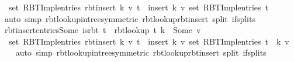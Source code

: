 \begin{isabellebody}
\ \ set\ {\isacharparenleft}{\kern0pt}RBT{\isacharunderscore}{\kern0pt}Impl{\isachardot}{\kern0pt}entries\ {\isacharparenleft}{\kern0pt}rbt{\isacharunderscore}{\kern0pt}insert\ k\ v\ t{\isacharparenright}{\kern0pt}{\isacharparenright}{\kern0pt}\ {\isacharequal}{\kern0pt}\ insert\ {\isacharparenleft}{\kern0pt}k{\isacharcomma}{\kern0pt}\ v{\isacharparenright}{\kern0pt}\ {\isacharparenleft}{\kern0pt}set\ {\isacharparenleft}{\kern0pt}RBT{\isacharunderscore}{\kern0pt}Impl{\isachardot}{\kern0pt}entries\ t{\isacharparenright}{\kern0pt}{\isacharparenright}{\kern0pt}{\isachardoublequoteclose}\isanewline
%
\isadelimproof
\ \ %
\endisadelimproof
%
\isatagproof
{}\isamarkupfalse%
\ {\isacharparenleft}{\kern0pt}auto\ simp{\isacharcolon}{\kern0pt}\ rbt{\isacharunderscore}{\kern0pt}lookup{\isacharunderscore}{\kern0pt}in{\isacharunderscore}{\kern0pt}tree{\isacharbrackleft}{\kern0pt}symmetric{\isacharbrackright}{\kern0pt}\ rbt{\isacharunderscore}{\kern0pt}lookup{\isacharunderscore}{\kern0pt}rbt{\isacharunderscore}{\kern0pt}insert\ split{\isacharcolon}{\kern0pt}\ if{\isacharunderscore}{\kern0pt}splits{\isacharparenright}{\kern0pt}%
\endisatagproof
{\isafoldproof}%
%
\isadelimproof
\isanewline
%
\endisadelimproof
\isanewline
{}\isamarkupfalse%
\ rbt{\isacharunderscore}{\kern0pt}insert{\isacharunderscore}{\kern0pt}entries{\isacharunderscore}{\kern0pt}Some{\isacharcolon}{\kern0pt}\ {\isachardoublequoteopen}is{\isacharunderscore}{\kern0pt}rbt\ t\ {\isasymLongrightarrow}\ rbt{\isacharunderscore}{\kern0pt}lookup\ t\ k\ {\isacharequal}{\kern0pt}\ Some\ v{\isacharprime}{\kern0pt}\ {\isasymLongrightarrow}\isanewline
\ \ set\ {\isacharparenleft}{\kern0pt}RBT{\isacharunderscore}{\kern0pt}Impl{\isachardot}{\kern0pt}entries\ {\isacharparenleft}{\kern0pt}rbt{\isacharunderscore}{\kern0pt}insert\ k\ v\ t{\isacharparenright}{\kern0pt}{\isacharparenright}{\kern0pt}\ {\isacharequal}{\kern0pt}\ insert\ {\isacharparenleft}{\kern0pt}k{\isacharcomma}{\kern0pt}\ v{\isacharparenright}{\kern0pt}\ {\isacharparenleft}{\kern0pt}set\ {\isacharparenleft}{\kern0pt}RBT{\isacharunderscore}{\kern0pt}Impl{\isachardot}{\kern0pt}entries\ t{\isacharparenright}{\kern0pt}\ {\isacharminus}{\kern0pt}\ {\isacharbraceleft}{\kern0pt}{\isacharparenleft}{\kern0pt}k{\isacharcomma}{\kern0pt}\ v{\isacharprime}{\kern0pt}{\isacharparenright}{\kern0pt}{\isacharbraceright}{\kern0pt}{\isacharparenright}{\kern0pt}{\isachardoublequoteclose}\isanewline
%
\isadelimproof
\ \ %
\endisadelimproof
%
\isatagproof
{}\isamarkupfalse%
\ {\isacharparenleft}{\kern0pt}auto\ simp{\isacharcolon}{\kern0pt}\ rbt{\isacharunderscore}{\kern0pt}lookup{\isacharunderscore}{\kern0pt}in{\isacharunderscore}{\kern0pt}tree{\isacharbrackleft}{\kern0pt}symmetric{\isacharbrackright}{\kern0pt}\ rbt{\isacharunderscore}{\kern0pt}lookup{\isacharunderscore}{\kern0pt}rbt{\isacharunderscore}{\kern0pt}insert\ split{\isacharcolon}{\kern0pt}\ if{\isacharunderscore}{\kern0pt}splits{\isacharparenright}{\kern0pt}%

\end{isabellebody}
